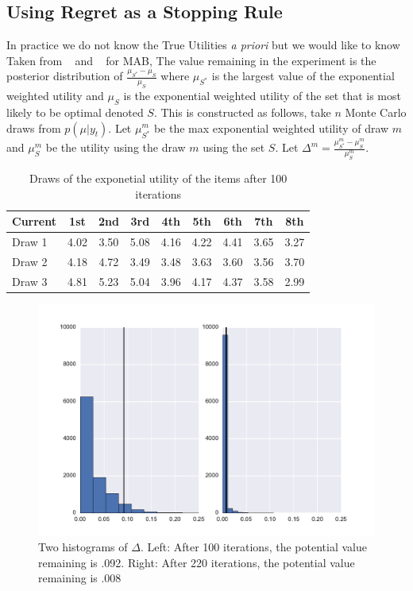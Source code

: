 \documentclass[nonblindrev]{informs3}
\begin{document}
\subsection{Using Regret as a Stopping Rule}
In practice we do not know the True Utilities \textit{a priori} but we would like to know 
Taken from ~\cite{scott2015multi} and ~\cite{scott2010modern} for MAB, The value remaining in the experiment is the posterior distribution of $\frac{\mu_{S^*}-\mu_{S}}{\mu_{S}}$ where $\mu_{S^*}$ is the largest value of the exponential weighted utility and $\mu_{S}$ is the exponential weighted utility of the set that is most likely to be optimal denoted $S$. This is constructed as follows, take $n$ Monte Carlo draws from $p(\mu|y_t)$. Let $\mu_{S^*}^{m}$ be the max exponential weighted utility of draw $m$ and $\mu_{S}^{m}$ be the utility using the draw $m$ using the set $S$. Let $\Delta^{m}=\frac{\mu^m_{S^*}-\mu^m_{S}}{\mu^m_{S}}$.\\
\begin{table}
\begin{center}
\begin{tabular}{l | c c c c c c c c}
Current & 1st &  2nd  &  3rd  &  4th &  5th & 6th & 7th &  8th \\
\hline
Draw 1 & 4.02 &  3.50 &  5.08 & 4.16&  4.22 & 4.41 & 3.65 &  3.27 \\
Draw 2 &4.18 & 4.72 & 3.49 & 3.48 & 3.63 & 3.60 & 3.56 &  3.70 \\
Draw 3 &4.81 & 5.23 & 5.04 &  3.96 &  4.17 & 4.37 &  3.58 & 2.99 \\ 
\end{tabular}
\end{center}
\caption{Draws of the exponetial utility of the items after 100 iterations}
\label{table:data}
\end{table}

\begin{figure}
\includegraphics[width=1\linewidth]{plots/valremhist.pdf}
\caption{Two histograms of $\Delta$. Left: After 100 iterations, the potential value remaining is .092. Right: After 220 iterations, the potential value remaining is .008}
\label{fig:data}
\end{figure}
\end{document}
